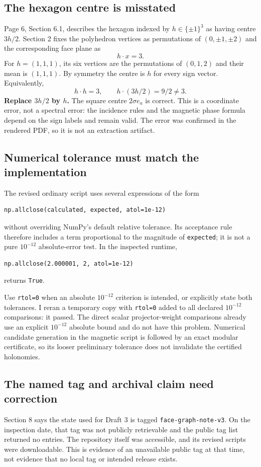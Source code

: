 \documentclass[11pt,a4paper]{article}
\begin{document}
\subsection{The hexagon centre is misstated}
Page 6, Section 6.1, describes the hexagon indexed by $h\in\{\pm1\}^3$ as having centre $3h/2$. Section 2 fixes the polyhedron vertices as permutations of $(0,\pm1,\pm2)$ and the corresponding face plane as
\[
 h\cdot x=3.
\]
For $h=(1,1,1)$, its six vertices are the permutations of $(0,1,2)$ and their mean is $(1,1,1)$. By symmetry the centre is $h$ for every sign vector. Equivalently,
\[
 h\cdot h=3,\qquad h\cdot(3h/2)=9/2\ne3.
\]
\textbf{Replace $3h/2$ by $h$.} The square centre $2\sigma e_a$ is correct. This is a coordinate error, not a spectral error: the incidence rules and the magnetic phase formula depend on the sign labels and remain valid. The error was confirmed in the rendered PDF, so it is not an extraction artifact.

\subsection{Numerical tolerance must match the implementation}
The revised ordinary script uses several expressions of the form
\begin{verbatim}
np.allclose(calculated, expected, atol=1e-12)
\end{verbatim}
without overriding NumPy's default relative tolerance. Its acceptance rule therefore includes a term proportional to the magnitude of \texttt{expected}; it is not a pure $10^{-12}$ absolute-error test. In the inspected runtime,
\begin{verbatim}
np.allclose(2.000001, 2, atol=1e-12)
\end{verbatim}
returns \texttt{True}.

Use \texttt{rtol=0} when an absolute $10^{-12}$ criterion is intended, or explicitly state both tolerances. I reran a temporary copy with \texttt{rtol=0} added to all declared $10^{-12}$ comparisons: it passed. The direct scalar projector-weight comparisons already use an explicit $10^{-12}$ absolute bound and do not have this problem. Numerical candidate generation in the magnetic script is followed by an exact modular certificate, so its looser preliminary tolerance does not invalidate the certified holonomies.

\subsection{The named tag and archival claim need correction}
Section 8 says the state used for Draft 3 is tagged \texttt{face-graph-note-v3}. On the inspection date, that tag was not publicly retrievable and the public tag list returned no entries. The repository itself was accessible, and its revised scripts were downloadable. This is evidence of an unavailable public tag at that time, not evidence that no local tag or intended release exists.
\end{document}
